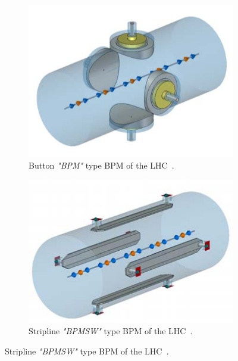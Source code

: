 \begin{figure}[H]
    \centering
    \begin{subfigure}[b]{0.45\textwidth}
        \includegraphics[width=\textwidth]{images/lhc_bpm_button.jpg}
        \caption{Button \textit{"BPM"} type BPM of the LHC~\cite{wendt_bpm_2020}.}
        \label{fig:beam_instrumentation_bpm_button}
    \end{subfigure}
    \hfill
    \begin{subfigure}[b]{0.45\textwidth}
        \includegraphics[width=\textwidth]{images/lhc_bpm_stripline.jpg}
        \caption{Stripline \textit{"BPMSW"} type BPM of the LHC~\cite{wendt_bpm_2020}.}
        \label{fig:beam_instrumentation_bpm_stripline}
    \end{subfigure}
\end{figure}


